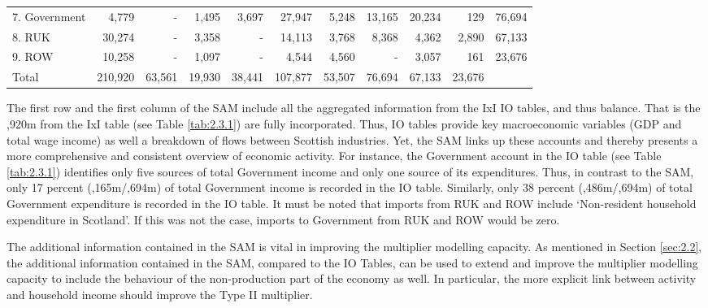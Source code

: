 \begin{table}[H]
\begin{scriptsize}
\begin{centering}
\begin{doublespacing}
\begin{tabular}{lrrrrrrrrrr}
  7. Government  &   4,779  & - & 1,495 & 3,697 & 27,947   & 5,248 &
  13,165 & 20,234 &     129  & 76,694  \\
  8. RUK  & 30,274   & - & 3,358 & - & 14,113   & 3,768 & 8,368 & 4,362 &
  2,890 & 67,133  \\
  9. ROW  & 10,258   & - & 1,097 & - &   4,544  & 4,560 & - & 3,057 & 161
  & 23,676  \bigstrut[b]\\
  \hline
  Total   & 210,920 & 63,561 & 19,930 & 38,441 & 107,877 & 53,507 & 76,694
  & 67,133 & 23,676 &  \bigstrut[t]\\
    \bottomrule \end{tabular}%
    \bigskip \begin{flushright}\end{flushright} \label{tab:2.3.2}
    \end{doublespacing} \end{centering} \end{scriptsize} \end{table}

\bigskip

The first row and the first column of the SAM include all the aggregated information from the IxI IO tables, and thus balance. That is the ,920m from the IxI table (see Table \ref{tab:2.3.1}) are fully incorporated. Thus, IO tables provide key macroeconomic variables (GDP and total wage income) as well a breakdown of flows between Scottish industries. Yet, the SAM links up these accounts and thereby presents a more comprehensive and consistent overview of economic activity. For instance, the Government account in the IO table (see Table \ref{tab:2.3.1}) identifies only five sources of total Government income and only one source of its expenditures. Thus, in contrast to the SAM, only 17 percent (,165m/,694m) of total Government income is recorded in the IO table. Similarly, only 38 percent (,486m/,694m) of total Government expenditure is recorded in the IO table. It must be noted that imports from RUK and ROW include `Non-resident household expenditure in Scotland'. If this was not the case, imports to Government from RUK and ROW would be zero.  

\bigskip

The additional information contained in the SAM is vital in improving the multiplier modelling capacity. As mentioned in Section \ref{sec:2.2}, the additional information contained in the SAM, compared to the IO Tables, can be used to extend and improve the multiplier modelling capacity to include the behaviour of the non-production part of the economy as well. In particular, the more explicit link between activity and household income should improve the Type II multiplier.

